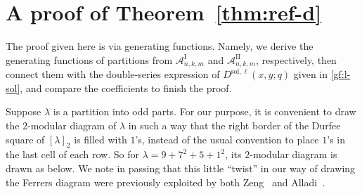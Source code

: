 \documentclass[11pt,reqno]{amsart}
\numberwithin{equation}{section}
\theoremstyle{plain}
\theoremstyle{definition}
\theoremstyle{named}
\def\Ao{\mathcal{A}^{\mathrm{I}}}
\def\A2{\mathcal{A}^{\mathrm{II}}}
\def\la{\lambda}
\def\sol{\mathrm{sol}}
\begin{document}
\section{A proof of Theorem~\ref{thm:ref-d}}\label{sec:pf thm1}
The proof given here is via generating functions. Namely, we derive the generating functions of partitions from $\Ao_{n,k,m}$ and $\A2_{n,k,m}$, respectively, then connect them with the double-series expression of $D^{\sol,\ell}(x,y;q)$ given in \eqref{gf:l-sol}, and compare the coefficients to finish the proof.

Suppose $\la$ is a partition into odd parts. For our purpose, it is convenient to draw the $2$-modular diagram of $\la$ in such a way that the right border of the Durfee square of $[\la]_2$ is filled with $1$'s, instead of the usual convention to place $1$'s in the last cell of each row. So for $\la=9+7^2+5+1^2$, its $2$-modular diagram is drawn as below. We note in passing that this little ``twist'' in our way of drawing the Ferrers diagram were previously exploited by both Zeng~\cite[cf. Fig.~2]{zen05} and Alladi~\cite[cf. Fig.~1 and Fig.~2]{all20}.
\end{document}
